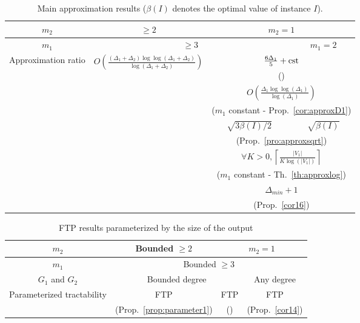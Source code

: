 \documentclass[final]{dmtcs-episciences}
\begin{document}
\begin{center}
\begin{table}[ht]
\centering
\footnotesize
\begin{tabular}{|c|c|c|c|}
\hline 
$m_2$ &\multicolumn{1}{|c|}{$\geq 2$}& \multicolumn{2}{|c|}{$m_2=1$}\\
\hline
$m_1$ &\multicolumn{2}{|c|}{$\geq 3$}& $m_1=2$\\
\hline
\hline
\multirow{12}{*}{Approximation ratio} &\multirow{6}{*}{$O\left(\frac{(\Delta_1+\Delta_2)\log \log(\Delta_1+\Delta_2)}{\log(\Delta_1+\Delta_2)}\right)$}&\multicolumn{2}{|c|}{$\frac{6\Delta_1}{5}+{\rm cst}$}\\
&&\multicolumn{2}{|c|}{(\citet{Fertin200990})}\\
\cline{3-4}
&&\multicolumn{2}{|c|}{$O\left(\frac{\Delta_1\log \log(\Delta_1)}{\log(\Delta_1)}\right)$}\\
&&\multicolumn{2}{|c|}{($m_1$ constant \-- Prop.~\ref{cor:approxD1})}\\
\cline{3-4}
&($m_i$ const., $i=1,2$ \-- Prop.~\ref{prop:generalapprox})&$\sqrt{3\beta(I)/2}$&$\sqrt{\beta(I)}$\\
&&\multicolumn{2}{|c|}{(Prop.~\ref{pro:approxsqrt})}\\
\cline{3-4}
&&\multicolumn{2}{|c|}{$\forall K>0, \left\lceil \frac{|V_1|}{K\log(|V_1|)}\right\rceil$}\\
&&\multicolumn{2}{|c|}{($m_1$ constant \-- Th.~\ref{th:approxlog})}\\
\cline{3-4}
&&\multicolumn{2}{|c|}{$\Delta_{min}+1$}\\
&&\multicolumn{2}{|c|}{(Prop.~\ref{cor16})}\\
\hline
\end{tabular}
\caption{Main approximation results ($\beta(I)$ denotes the optimal value of instance $I$).}
\label{table-approx}
\end{table}
\end{center}

\begin{center}
\begin{table}[ht]
\centering
\footnotesize
\begin{tabular}{|c|c|c|c|}
\hline 
$m_2$ &\multicolumn{1}{|c|}{Bounded $\geq 2$}& \multicolumn{2}{|c|}{$m_2=1$}\\
\hline
$m_1$ &\multicolumn{3}{|c|}{Bounded $\geq 3$}\\
\hline
$G_1$ and $G_2$& \multicolumn{2}{|c|}{Bounded degree}&Any degree\\
\hline
\hline
\multirow{2}{*}{Parameterized tractability} &FTP&FTP&FTP\\
&(Prop.~\ref{prop:parameter1})&(\citet{Fertin200990})&(Prop.~\ref{cor14})\\
\hline
\end{tabular}
\caption{FTP results parameterized by the size of the output}
\label{table-parameter}
\end{table}
\end{center}
\end{document}
